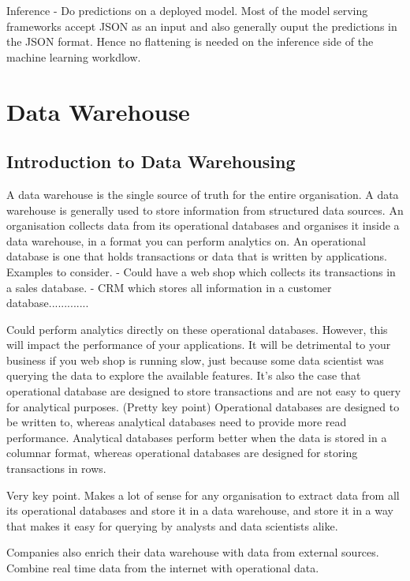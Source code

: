 \documentclass[11pt]{article}
\begin{document}
    Inference
    - Do predictions on a deployed model.
    Most of the model serving frameworks accept JSON as an input and also generally ouput the predictions in the JSON format.
    Hence no flattening is needed on the inference side of the machine learning workdlow.


    \section{Data Warehouse}
    
    \subsection{Introduction to Data Warehousing}
    A data warehouse is the single source of truth for the entire organisation.
    A data warehouse is generally used to store information from structured data sources.
    An organisation collects data from its operational databases and organises it inside a data warehouse, in a format you can perform analytics on.
    An operational database is one that holds transactions or data that is written by applications.
    Examples to consider.
    - Could have a web shop which collects its transactions in a sales database.
    - CRM which stores all information in a customer database.............

    Could perform analytics directly on these operational databases.
    However, this will impact the performance of your applications.
    It will be detrimental to your business if you web shop is running slow, just because some data scientist was querying the data to explore the available features.
    It's also the case that operational database are designed to store transactions and are not easy to query for analytical purposes. (Pretty key point)
    Operational databases are designed to be written to, whereas analytical databases need to provide more read performance.
    Analytical databases perform better when the data is stored in a columnar format, whereas operational databases are designed for storing transactions in rows.

    Very key point.
    Makes a lot of sense for any organisation to extract data from all its operational databases and store it in a data warehouse,
    and store it in a way that makes it easy for querying by analysts and data scientists alike.

    Companies also enrich their data warehouse with data from external sources.
    Combine real time data from the internet with operational data.
\end{document}
